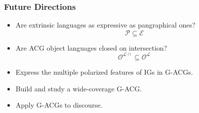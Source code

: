 \documentclass{beamer}
\begin{document}
\begin{frame}
  \frametitle{Future Directions}

  \begin{itemize}
  \item Are extrinsic languages as expressive as pangraphical
    ones? $$\mathcal{P} \subseteq \mathcal{E}$$
  \item Are ACG object languages closed on
    intersection? $$\mathcal{O}^{\mathcal{L}{\cap}} \subseteq \mathcal{O}^{\mathcal{L}}$$
  \item Express the multiple polarized features of IGs in G-ACGs.
    \vfill
  \item Build and study a wide-coverage G-ACG.
    \vfill
  \item Apply G-ACGs to discourse.
  \end{itemize}
\end{frame}


\appendix
{}
\setcounter{finalframe}{\value{framenumber}}
\end{document}
